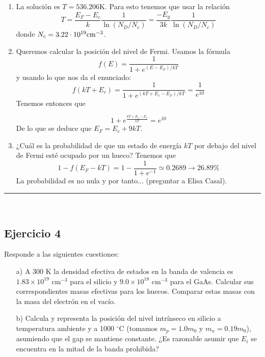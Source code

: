 	\begin{enumerate}[label=\alph*)]
		\item La solución es $T=536.206$K. Para esto tenemos que usar la relación
		      \begin{equation}
			      T = \frac{E_F-E_c}{k} \frac{1}{\ln (N_D/N_c)} =  \frac{-E_g}{3k} \frac{1}{\ln (N_D/N_c)}
		      \end{equation}
		      donde $N_c=3.22\cdot 10^{19}\text{cm}^{-3}$.
		\item Queremos calcular la posición del nivel de Fermi. Usamos la fórmula
		      \begin{equation}
			      f(E) = \frac{1}{1+e^{(E-E_F)/kT}}
		      \end{equation}
		      y usando lo que nos da el enunciado:
		      \begin{equation}
			      f(kT+E_c) = \frac{1}{1+e^{(kT+E_c-E_F)/kT}}
			      = \frac{1}{e^{10}}
		      \end{equation}
		      Tenemos entonces que

		      \begin{equation}
			      1+e^{\frac{kT+E_c-E_f}{kT}} = e^{10}
		      \end{equation}
		      De lo que se deduce que $E_F = E_c + 9kT$.
		\item ¿Cuál es la probabilidad de que un estado de energía \( kT \) por debajo del nivel de Fermi esté ocupado por un hueco? Tenemos que
		      \begin{equation}
			      1-f(E_F-kT) = 1 - \frac{1}{1+e^{-1}} \simeq 0.2689 \rightarrow 26.89 \%
		      \end{equation}
		      La probabilidad es no nula y por tanto... (preguntar a Elisa Casal).
	\end{enumerate}

\rule{\textwidth}{0.1pt} \\[2pt]

\subsection{Ejercicio 4}

Responde a las siguientes cuestiones:
\begin{enumerate}
	\item[a)] A 300 K la densidad efectiva de estados en la banda de valencia es $1.83 \times 10^{19} \text{ cm}^{-3}$ para el silicio y $9.0 \times 10^{18} \text{ cm}^{-3}$ para el GaAs. Calcular sus correspondientes masas efectivas para los huecos. Comparar estas masas con la masa del electrón en el vacío.

	\item[b)] Calcula y representa la posición del nivel intrínseco en silicio a temperatura ambiente y a 1000 $^{\circ}$C (tomamos $m_p = 1.0m_0$ y $m_n = 0.19m_0$), asumiendo que el gap se mantiene constante. ¿Es razonable asumir que $E_i$ se encuentra en la mitad de la banda prohibida?
\end{enumerate}

